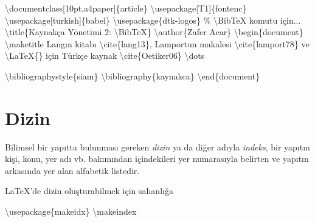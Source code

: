 \documentclass[
  letterpaper,
  DIV=11,
  numbers=noendperiod]{scrreprt}
\newenvironment{Shaded}{\begin{snugshade}}{\end{snugshade}}
\newcommand{\BuiltInTok}[1]{\textcolor[rgb]{0.00,0.23,0.31}{#1}}
\newcommand{\CommentTok}[1]{\textcolor[rgb]{0.37,0.37,0.37}{#1}}
\newcommand{\ExtensionTok}[1]{\textcolor[rgb]{0.00,0.23,0.31}{#1}}
\newcommand{\FunctionTok}[1]{\textcolor[rgb]{0.28,0.35,0.67}{#1}}
\newcommand{\KeywordTok}[1]{\textcolor[rgb]{0.00,0.23,0.31}{#1}}
\newcommand{\NormalTok}[1]{\textcolor[rgb]{0.00,0.23,0.31}{#1}}
\begin{document}
\begin{Shaded}
\begin{Highlighting}[]
\BuiltInTok{\textbackslash{}documentclass}\NormalTok{[10pt,a4paper]\{}\ExtensionTok{article}\NormalTok{\}}
\BuiltInTok{\textbackslash{}usepackage}\NormalTok{[T1]\{}\ExtensionTok{fontenc}\NormalTok{\}}
\BuiltInTok{\textbackslash{}usepackage}\NormalTok{[turkish]\{}\ExtensionTok{babel}\NormalTok{\}}
\BuiltInTok{\textbackslash{}usepackage}\NormalTok{\{}\ExtensionTok{dtk{-}logos}\NormalTok{\} }\CommentTok{\% \textbackslash{}BibTeX komutu için...}
\FunctionTok{\textbackslash{}title}\NormalTok{\{Kaynakça Yönetimi 2: }\FunctionTok{\textbackslash{}BibTeX}\NormalTok{\}}
\FunctionTok{\textbackslash{}author}\NormalTok{\{Zafer Acar\}}
\KeywordTok{\textbackslash{}begin}\NormalTok{\{}\ExtensionTok{document}\NormalTok{\}}
\FunctionTok{\textbackslash{}maketitle}
\NormalTok{Lang\textquotesingle{}ın kitabı }\KeywordTok{\textbackslash{}cite}\NormalTok{\{}\ExtensionTok{lang13}\NormalTok{\}, Lamport\textquotesingle{}un makalesi  }\KeywordTok{\textbackslash{}cite}\NormalTok{\{}\ExtensionTok{lamport78}\NormalTok{\} }
\NormalTok{ve }\FunctionTok{\textbackslash{}LaTeX}\NormalTok{\{\} için Türkçe kaynak }\KeywordTok{\textbackslash{}cite}\NormalTok{\{}\ExtensionTok{Oetiker06}\NormalTok{\} }\FunctionTok{\textbackslash{}dots}

\BuiltInTok{\textbackslash{}bibliographystyle}\NormalTok{\{}\ExtensionTok{siam}\NormalTok{\}}
\BuiltInTok{\textbackslash{}bibliography}\NormalTok{\{}\ExtensionTok{kaynakca}\NormalTok{\}}
\KeywordTok{\textbackslash{}end}\NormalTok{\{}\ExtensionTok{document}\NormalTok{\}}
\end{Highlighting}
\end{Shaded}

\hypertarget{dizin}{%
\section{Dizin}\label{dizin}}

Bilimsel bir yapıtta bulunması gereken \emph{dizin} ya da diğer adıyla
\emph{indeks}, bir yapıtın kişi, konu, yer adı vb. bakımından
içindekileri yer numarasıyla belirten ve yapıtın arkasında yer alan
alfabetik listedir.

{\LaTeX}'de dizin oluşturabilmek için sahanlığa

\begin{Shaded}
\begin{Highlighting}[]
\BuiltInTok{\textbackslash{}usepackage}\NormalTok{\{}\ExtensionTok{makeidx}\NormalTok{\}}
\FunctionTok{\textbackslash{}makeindex}
\end{Highlighting}
\end{Shaded}
\end{document}
